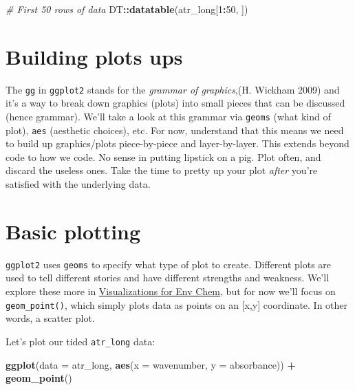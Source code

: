 \documentclass[
]{book}
\newenvironment{Shaded}{\begin{snugshade}}{\end{snugshade}}
\newcommand{\AttributeTok}[1]{\textcolor[rgb]{0.13,0.29,0.53}{#1}}
\newcommand{\CommentTok}[1]{\textcolor[rgb]{0.56,0.35,0.01}{\textit{#1}}}
\newcommand{\DecValTok}[1]{\textcolor[rgb]{0.00,0.00,0.81}{#1}}
\newcommand{\FunctionTok}[1]{\textcolor[rgb]{0.13,0.29,0.53}{\textbf{#1}}}
\newcommand{\NormalTok}[1]{#1}
\newcommand{\SpecialCharTok}[1]{\textcolor[rgb]{0.81,0.36,0.00}{\textbf{#1}}}
\begin{document}
\begin{Shaded}
\begin{Highlighting}[]
\CommentTok{\# First 50 rows of data}
\NormalTok{DT}\SpecialCharTok{::}\FunctionTok{datatable}\NormalTok{(atr\_long[}\DecValTok{1}\SpecialCharTok{:}\DecValTok{50}\NormalTok{, ])}
\end{Highlighting}
\end{Shaded}

\hypertarget{building-plots-ups}{%
\section{Building plots ups}\label{building-plots-ups}}

The \texttt{gg} in \texttt{ggplot2} stands for the \emph{grammar of graphics},(H. Wickham 2009) and it's a way to break down graphics (plots) into small pieces that can be discussed (hence grammar). We'll take a look at this grammar via \texttt{geoms} (what kind of plot), \texttt{aes} (aesthetic choices), etc. For now, understand that this means we need to build up graphics/plots piece-by-piece and layer-by-layer. This extends beyond code to how we code. No sense in putting lipstick on a pig. Plot often, and discard the useless ones. Take the time to pretty up your plot \emph{after} you're satisfied with the underlying data.

\hypertarget{basic-plotting}{%
\section{Basic plotting}\label{basic-plotting}}

\texttt{ggplot2} uses \texttt{geoms} to specify what type of plot to create. Different plots are used to tell different stories and have different strengths and weakness. We'll explore these more in \protect\hyperlink{visualizations-for-env-chem}{Visualizations for Env Chem}, but for now we'll focus on \texttt{geom\_point()}, which simply plots data as points on an {[}x,y{]} coordinate. In other words, a scatter plot.

Let's plot our tided \texttt{atr\_long} data:

\begin{Shaded}
\begin{Highlighting}[]
\FunctionTok{ggplot}\NormalTok{(}\AttributeTok{data =}\NormalTok{ atr\_long, }
       \FunctionTok{aes}\NormalTok{(}\AttributeTok{x =}\NormalTok{ wavenumber, }\AttributeTok{y =}\NormalTok{ absorbance)) }\SpecialCharTok{+}
  \FunctionTok{geom\_point}\NormalTok{()}
\end{Highlighting}
\end{Shaded}
\end{document}
